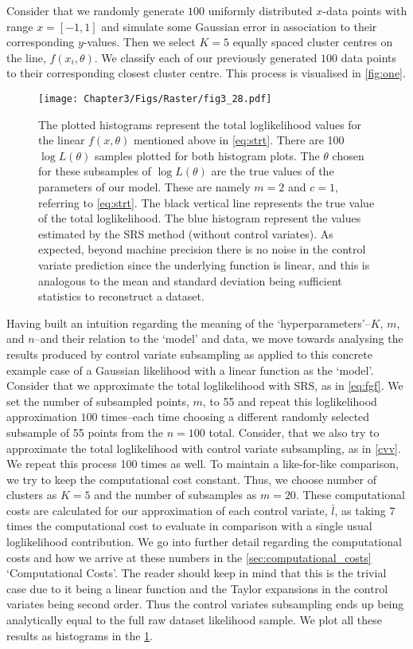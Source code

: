 Consider that we randomly generate $100$ uniformly distributed $x$-data points with range $x=[-1,1]$ and simulate some Gaussian error in association to their corresponding $y$-values. Then we select $K=5$ equally spaced cluster centres on the line, $f(x_{i}, \theta )$. We classify each of our previously generated $100$ data points to their corresponding closest cluster centre. This process is visualised in \cref{fig:one}.


\begin{figure} 
\centering    
\texttt{[image: Chapter3/Figs/Raster/fig3\_28.pdf]}
\caption{ The plotted histograms represent the total loglikelihood values for the linear $f(x,\theta)$ mentioned above in \cref{eq:strt}. There are 100 $\log L(\theta)$ samples plotted for both histogram plots. The $\theta$ chosen for these subsamples of $\log L(\theta)$ are the true values of the parameters of our model. These are namely $m=2$ and $c=1$, referring to \cref{eq:strt}. The black vertical line represents the true value of the total loglikelihood. The blue histogram represent the values estimated by the SRS method (without control variates). As expected, beyond machine precision there is no noise in the control variate prediction since the underlying function is linear, and this is analogous to the mean and standard deviation being sufficient statistics to reconstruct a dataset.}
\label{fig:two}
\end{figure}

Having built an intuition regarding the meaning of the `hyperparameters'--$K$, $m$, and $n$--and their relation to the `model' and data, we move towards analysing the results produced by control variate subsampling as applied to this concrete example case of a Gaussian likelihood with a linear function as the `model'. Consider that we approximate the total loglikelihood with SRS, as in \cref{eq:fgf}. We set the number of subsampled points, $m$, to 55 and repeat this loglikelihood approximation $100$ times--each time choosing a different randomly selected subsample of 55 points from the $n=100$ total. Consider, that we also try to approximate the total loglikelihood with control variate subsampling, as in \cref{cvv}. We repeat this process 100 times as well. To maintain a like-for-like comparison, we try to keep the computational cost constant. Thus, we choose number of clusters as $K=5$ and the number of subsamples as $m=20$. These computational costs are calculated for our approximation of each control variate, $\bar{l}$, as taking 7 times the computational cost to evaluate in comparison with a single usual loglikelihood contribution. We go into further detail regarding the computational costs and how we arrive at these numbers in the \cref{sec:computational_costs} `Computational Costs'. The reader should keep in mind that this is the trivial case due to it being a linear function and the Taylor expansions in the control variates being second order. Thus the control variates subsampling ends up being analytically equal to the full raw dataset likelihood sample. We plot all these results as histograms in the \cref{fig:two}.



